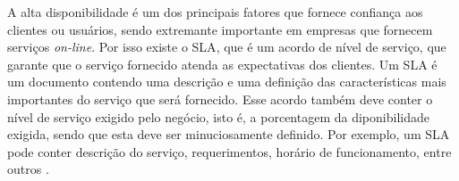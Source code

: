 A alta disponibilidade é um dos principais fatores que fornece confiança aos clientes ou usuários, sendo extremante importante 
em empresas que fornecem serviços \textit{on-line}. Por isso existe o \ac{SLA}, que é um acordo de nível de serviço, que garante que 
o serviço fornecido atenda as expectativas dos clientes. Um \ac{SLA} é um documento contendo uma descrição e uma definição das 
características mais importantes do serviço que será fornecido. Esse acordo também deve conter o nível de serviço exigido pelo negócio, 
isto é, a porcentagem da diponibilidade exigida, sendo que esta deve ser minuciosamente definido. Por exemplo, um \ac{SLA} pode conter 
descrição do serviço, requerimentos, horário de funcionamento, entre outros \cite{smith2010}.
